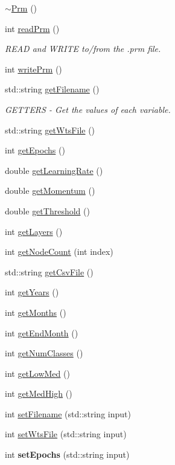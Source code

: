 \begin{DoxyCompactItemize}
\item 
\hyperlink{classPrm_aee17296d5aed3b88420a62a2185f3bf9}{$\sim$\-Prm} ()
\item 
int \hyperlink{classPrm_a86cfc66d28a7b2d5ff0f00682448b5cc}{read\-Prm} ()
\begin{DoxyCompactList}\small\item\em R\-E\-A\-D and W\-R\-I\-T\-E to/from the .prm file. \end{DoxyCompactList}\item 
int \hyperlink{classPrm_ae7efb4cd15c4fa2b581f5ec516018ec2}{write\-Prm} ()
\item 
std\-::string \hyperlink{classPrm_a7ab628ec643cc240fd9979df81a4ecb0}{get\-Filename} ()
\begin{DoxyCompactList}\small\item\em G\-E\-T\-T\-E\-R\-S -\/ Get the values of each variable. \end{DoxyCompactList}\item 
std\-::string \hyperlink{classPrm_a09dc17d58a61737ed513d8d5c6cbaeae}{get\-Wts\-File} ()
\item 
int \hyperlink{classPrm_a0bda0fec335fce1dcdba315a15b31edf}{get\-Epochs} ()
\item 
double \hyperlink{classPrm_a9a12b899f11e0907e27dccfd65419677}{get\-Learning\-Rate} ()
\item 
double \hyperlink{classPrm_a07542e2fc8093909c7c3605c3e908ccb}{get\-Momentum} ()
\item 
double \hyperlink{classPrm_ab3d757e98a474f1dc8a9cbd2e5296c82}{get\-Threshold} ()
\item 
int \hyperlink{classPrm_a2dd4ccfd107de996eddb983529164c2b}{get\-Layers} ()
\item 
int \hyperlink{classPrm_a6e807edee7fa65407fd1ebf01e381443}{get\-Node\-Count} (int index)
\item 
std\-::string \hyperlink{classPrm_aaa889209a4dfd53f505ad40f7a29db4b}{get\-Csv\-File} ()
\item 
int \hyperlink{classPrm_a00fc7382bd10e89bc1c76a51c2213c31}{get\-Years} ()
\item 
int \hyperlink{classPrm_a30316047049e959eac21840f5095dcaa}{get\-Months} ()
\item 
int \hyperlink{classPrm_a44972b47eb79e02a12452bab99323803}{get\-End\-Month} ()
\item 
int \hyperlink{classPrm_a5e3f77b5e785047d4df1cc56feed9e6e}{get\-Num\-Classes} ()
\item 
int \hyperlink{classPrm_a8dff72e78d8035aab1ced3a932c18922}{get\-Low\-Med} ()
\item 
int \hyperlink{classPrm_a72ebfd538bb7ccef05219381d3fbf904}{get\-Med\-High} ()
\item 
int \hyperlink{classPrm_a8dcc18be467324d78416adeeea3d0260}{set\-Filename} (std\-::string input)
\item 
int \hyperlink{classPrm_ae0340fa267f847901c330b40b368cc72}{set\-Wts\-File} (std\-::string input)
\item 
\hypertarget{classPrm_ae0881471305d45e9d7d002fdd84cb233}{int {\bfseries set\-Epochs} (std\-::string input)}\label{classPrm_ae0881471305d45e9d7d002fdd84cb233}


\end{DoxyCompactItemize}
